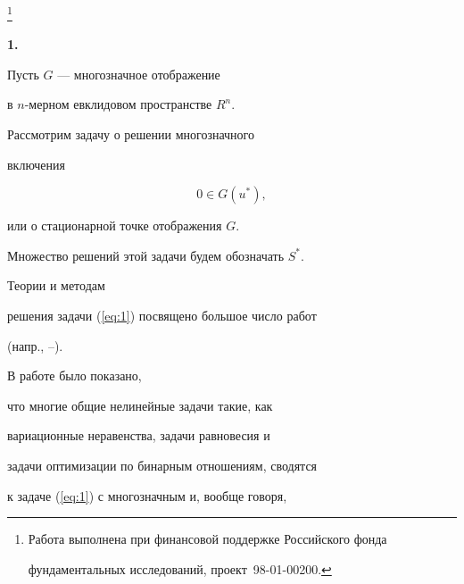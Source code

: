 \thanks{Работа выполнена при финансовой поддержке Российского фонда


фундаментальных исследований, проект \No\,98-01-00200.}


\date{}







\pagestyle{plain} %













\maketitle


\label{begin}





{\bf 1.}


Пусть $G$ --- многозначное отображение


в $n$-мерном евклидовом пространстве $R^{n}$.


Рассмотрим задачу о решении многозначного


включения


\begin{equation}


\label{eq:1}


0\in G(u^{*}),


\end{equation}


или о стационарной точке отображения $G$.


Множество решений этой задачи будем обозначать $S^{*}$.


Теории и методам


решения задачи (\ref{eq:1}) посвящено большое число работ


(напр., \cite{Vai72}--\cite{Ob88}).


В работе \cite{Kon96} было показано,


что многие общие нелинейные задачи такие, как


вариационные неравенства, задачи равновесия и


задачи оптимизации по бинарным отношениям, сводятся


к задаче (\ref{eq:1}) с многозначным и, вообще говоря,


